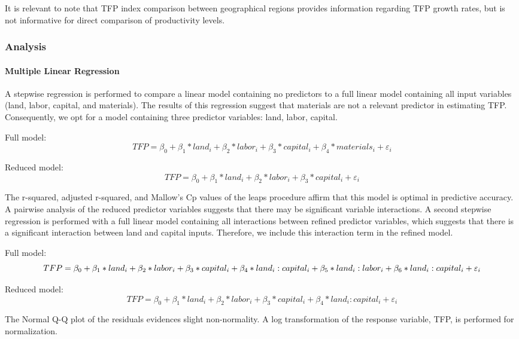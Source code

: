 \documentclass[
  letterpaper,
  DIV=11,
  numbers=noendperiod]{scrartcl}
\let\oldparagraph\paragraph
\renewcommand{\paragraph}[1]{\oldparagraph{#1}\mbox{}}
\begin{document}
It is relevant to note that TFP index comparison between geographical
regions provides information regarding TFP growth rates, but is not
informative for direct comparison of productivity levels.

\hypertarget{analysis}{%
\subsubsection{Analysis}\label{analysis}}

\hypertarget{multiple-linear-regression}{%
\paragraph{Multiple Linear
Regression}\label{multiple-linear-regression}}

A stepwise regression is performed to compare a linear model containing
no predictors to a full linear model containing all input variables
(land, labor, capital, and materials). The results of this regression
suggest that materials are not a relevant predictor in estimating TFP.
Consequently, we opt for a model containing three predictor variables:
land, labor, capital.

Full model:
\[TFP = \beta_0 + \beta_1*land_i + \beta_2*labor_i + \beta_3*capital_i + \beta_4 * materials_i + \varepsilon_i\]

Reduced model:
\[TFP = \beta_0 + \beta_1*land_i + \beta_2*labor_i + \beta_3*capital_i  + \varepsilon_i\]

The r-squared, adjusted r-squared, and Mallow's Cp values of the leaps
procedure affirm that this model is optimal in predictive accuracy. A
pairwise analysis of the reduced predictor variables suggests that there
may be significant variable interactions. A second stepwise regression
is performed with a full linear model containing all interactions
between refined predictor variables, which suggests that there is a
significant interaction between land and capital inputs. Therefore, we
include this interaction term in the refined model.

Full model:
\[TFP = \beta_0 + \beta_1*land_i + \beta_2*labor_i + \beta_3*capital_i  + \beta_4*land_i:capital_i + \\ \beta_5*land_i:labor_i + \beta_6*land_i:capital_i + \varepsilon_i\]

Reduced model:
\[TFP = \beta_0 + \beta_1*land_i + \beta_2*labor_i + \beta_3*capital_i + \beta_4 * land_i:capital_i + \varepsilon_i\]

The Normal Q-Q plot of the residuals evidences slight non-normality. A
log transformation of the response variable, TFP, is performed for
normalization.
\end{document}

